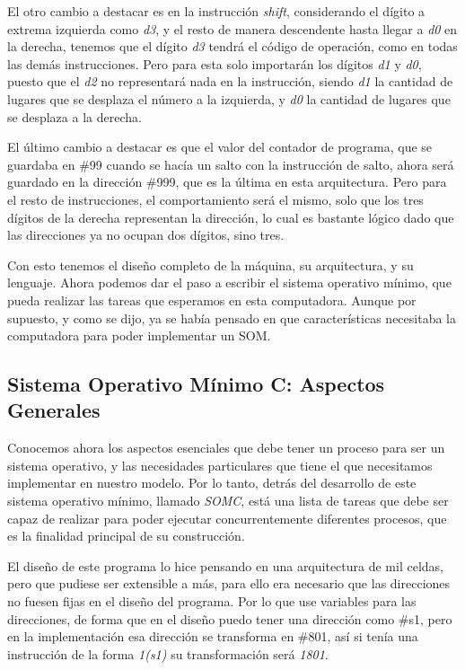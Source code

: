 \documentclass[letterpaper,12pt,oneside]{book}
\begin{document}
		El otro cambio a destacar es en la instrucción \textit{shift}, considerando el dígito a extrema izquierda como \textit{d3}, y el resto de manera descendente
		hasta llegar a \textit{d0} en la derecha, tenemos que el dígito \textit{d3} tendrá el código de operación, como en todas las demás instrucciones. Pero
		para esta solo importarán los dígitos \textit{d1} y \textit{d0}, puesto que el \textit{d2} no representará nada en la instrucción, siendo \textit{d1} la cantidad de lugares que se desplaza el número a la izquierda, y \textit{d0} la cantidad de lugares que se desplaza a la derecha.
		
		El último cambio a destacar es que el valor del contador de programa, que se guardaba en \#99 cuando se hacía un salto con la instrucción de salto, ahora
		será guardado en la dirección \#999, que es la última en esta arquitectura. Pero para el resto de instrucciones,
		el comportamiento será el mismo, solo que los tres dígitos de la derecha representan la dirección, lo cual es bastante lógico dado que las direcciones
		ya no ocupan dos dígitos, sino tres.
		
		Con esto tenemos el diseño completo de la máquina, su arquitectura, y su lenguaje. Ahora podemos dar el paso a escribir el sistema operativo mínimo, que
		pueda realizar las tareas que esperamos en esta computadora. Aunque por supuesto, y como se dijo, ya se había pensado en que características necesitaba la computadora
		para poder implementar un SOM.

		
		\subsection{Sistema Operativo Mínimo C: Aspectos Generales}
		
		Conocemos ahora los aspectos esenciales que debe tener un proceso para ser un sistema operativo, y las necesidades particulares que tiene
		el que necesitamos implementar en nuestro modelo. Por lo tanto, detrás del desarrollo de este sistema operativo
		mínimo, llamado \textit{SOMC}, está una lista de tareas que debe ser capaz de realizar para poder ejecutar concurrentemente diferentes procesos, que es la finalidad principal de su construcción.
		
		El diseño de este programa lo hice pensando en una arquitectura de mil celdas, pero que pudiese ser extensible a más, para ello era necesario
		que las direcciones no fuesen fijas en el diseño del programa. Por lo que use variables para las direcciones, de forma que en
		el diseño puedo tener una dirección como \#s1, pero en la implementación esa dirección se transforma en \#801, así si tenía una
		instrucción de la forma \textit{1(s1)} su transformación será \textit{1801}.
  
\end{document}
